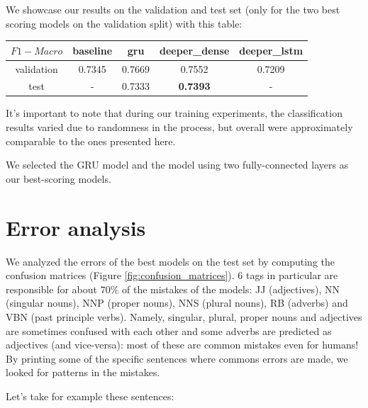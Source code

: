 \documentclass[letterpaper,10.8pt]{article}
\begin{document}
We showcase our results on the validation and test set (only for the two best scoring models on the validation split) with this table:

\begin{center}
\begin{tabular}{c | c  c  c  c }
    $F1-Macro$ & baseline & gru & deeper\_dense & deeper\_lstm  \\
    \hline
    validation & 0.7345 & 0.7669 & 0.7552 & 0.7209 \\
    test       &    -   & 0.7333 & \textbf{0.7393} & - \\
\end{tabular}
\end{center}


It's important to note that during our training experiments, the classification results varied due to randomness in the process, but overall were approximately comparable to the ones presented here. 

We selected the GRU model and the model using two fully-connected layers as our best-scoring models.

\section{Error analysis}

We analyzed the errors of the best models on the test set by computing the confusion matrices (Figure \ref{fig:confusion_matrices}). 6 tags in particular are responsible for about $70\%$ of the mistakes of the models: JJ (adjectives), NN (singular nouns), NNP (proper nouns), NNS (plural nouns), RB (adverbs) and VBN (past principle verbs). Namely, singular, plural, proper nouns and adjectives are sometimes confused with each other and some adverbs are predicted as adjectives (and vice-versa): most of these are common mistakes even for humans! By printing some of the specific sentences where commons errors are made, we looked for patterns in the mistakes.

Let's take for example these sentences:

\end{document}

